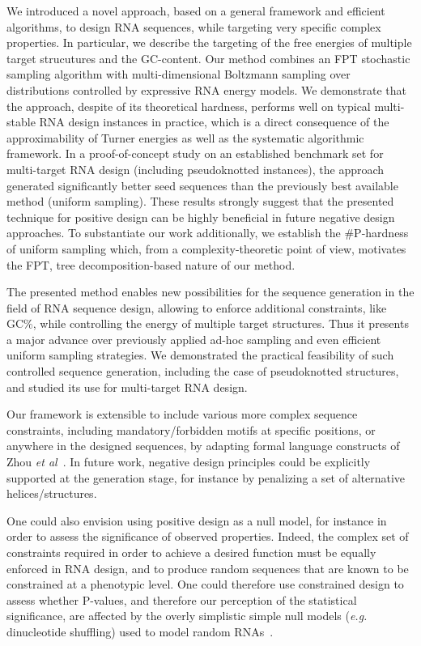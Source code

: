 \documentclass[]{bmcart}
\newcommand{\Nuc}[1]{{\sf #1}}
\newcommand{\Cb}{\Nuc{C}}
\newcommand{\Gb}{\Nuc{G}}
\newcommand{\GCb}{\Gb\Cb}
\newcommand{\citet}[1]{\cite{#1}}
\newcommand{\revised}[1]{{\color{red} #1}}
\begin{document}
We introduced a novel approach, based on a general framework and efficient algorithms, to design RNA
sequences, while targeting very specific complex properties. In particular, we describe the targeting of the free energies of multiple target strucutures and the \GCb-content.
Our method combines an FPT stochastic sampling algorithm
with multi-dimensional Boltzmann sampling over distributions
controlled by expressive RNA energy models. \revised{We demonstrate that the approach, despite of its theoretical hardness, performs well on typical multi-stable RNA design instances in practice, which is a direct consequence of the approximability of Turner energies as well as the systematic algorithmic framework. In a proof-of-concept study 
  on an established benchmark set for multi-target RNA design (including pseudoknotted instances), 
  the approach generated significantly better seed sequences than
the previously best available method (uniform sampling). These results strongly suggest that the presented technique for positive design can be highly beneficial in future negative design approaches.}
%
To substantiate our work additionally, we establish the $\#${\sf P}-hardness of uniform sampling which,
from a complexity-theoretic point of view, motivates the FPT, tree decomposition-based nature of our method.  

The presented method enables new possibilities for the sequence generation
in the field of RNA sequence design, allowing to enforce additional
constraints, like \GCb\%, while controlling the energy of
multiple target structures. Thus it presents a major advance over
previously applied ad-hoc sampling and even efficient uniform sampling
strategies. We demonstrated the practical feasibility of such controlled sequence
generation, including the case of pseudoknotted structures, and studied its use for multi-target RNA design.

Our framework is extensible to include various more complex sequence constraints, including mandatory/forbidden motifs at specific
positions, or anywhere in the designed sequences, by adapting formal language constructs
of Zhou \emph{et al}~\citet{Zhou2013}. In future work, negative design principles could 
be explicitly supported at the generation stage, for instance by
penalizing a set of alternative helices/structures.

One could also envision using positive design as a null model, for instance in order to assess the significance of observed properties. Indeed, the complex set of constraints required in order to achieve a desired function must be equally enforced in RNA design, and to produce random sequences that are known to be constrained at a phenotypic level. One could therefore use constrained design to assess whether P-values, and therefore our perception of the statistical significance, are affected by the overly simplistic simple null models (\emph{e.g.} dinucleotide shuffling) used to model random RNAs~\cite{Rivas2017}.
\end{document}
